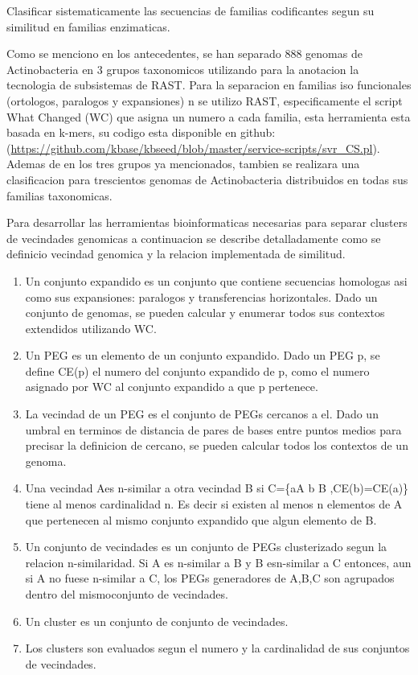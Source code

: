 \documentclass[12pt,twoside]{reedthesis}
\begin{document}
  Clasificar sistematicamente las secuencias de familias codificantes
  segun su similitud en familias enzimaticas.
  
  Como se menciono en los antecedentes, se han separado 888 genomas de
  Actinobacteria en 3 grupos taxonomicos utilizando para la anotacion la
  tecnologia de subsistemas de RAST. Para la separacion en familias iso
  funcionales (ortologos, paralogos y expansiones) n se utilizo RAST,
  especificamente el script What Changed (WC) que asigna un numero a cada
  familia, esta herramienta esta basada en k-mers, su codigo esta
  disponible en github:
  (\url{https://github.com/kbase/kbseed/blob/master/service-scripts/svr_CS.pl}).
  Ademas de en los tres grupos ya mencionados, tambien se realizara una
  clasificacion para trescientos genomas de Actinobacteria distribuidos en
  todas sus familias taxonomicas.
  
  Para desarrollar las herramientas bioinformaticas necesarias para
  separar clusters de vecindades genomicas a continuacion se describe
  detalladamente como se definicio vecindad genomica y la relacion
  implementada de similitud.
  
  \begin{enumerate}
  \def\labelenumi{\arabic{enumi}.}
  \item
    Un conjunto expandido es un conjunto que contiene secuencias homologas
    asi como sus expansiones: paralogos y transferencias horizontales.
    Dado un conjunto de genomas, se pueden calcular y enumerar todos sus
    contextos extendidos utilizando WC.
  \item
    Un PEG es un elemento de un conjunto expandido. Dado un PEG p, se
    define CE(p) el numero del conjunto expandido de p, como el numero
    asignado por WC al conjunto expandido a que p pertenece.
  \item
    La vecindad de un PEG es el conjunto de PEGs cercanos a el. Dado un
    umbral en terminos de distancia de pares de bases entre puntos medios
    para precisar la definicion de cercano, se pueden calcular todos los
    contextos de un genoma.
  \item
    Una vecindad Aes n-similar a otra vecindad B si C=\{aA \textbar{} b B
    ,CE(b)=CE(a)\} tiene al menos cardinalidad n. Es decir si existen al
    menos n elementos de A que pertenecen al mismo conjunto expandido que
    algun elemento de B.
  \item
    Un conjunto de vecindades es un conjunto de PEGs clusterizado segun la
    relacion n-similaridad. Si A es n-similar a B y B esn-similar a C
    entonces, aun si A no fuese n-similar a C, los PEGs generadores de
    A,B,C son agrupados dentro del mismoconjunto de vecindades.
  \item
    Un cluster es un conjunto de conjunto de vecindades.
  \item
    Los clusters son evaluados segun el numero y la cardinalidad de sus
    conjuntos de vecindades.
  \end{enumerate}
  
\end{document}
